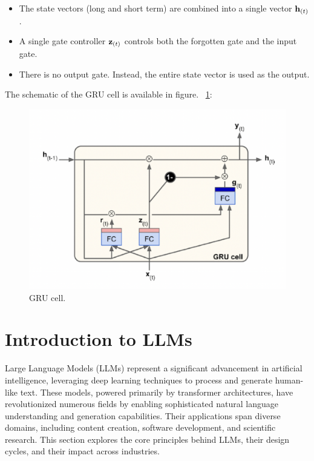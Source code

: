\begin{itemize}
    \item The state vectors (long and short term) are combined into a single vector ${\bf h}_{(t)}$.
    \item A single gate controller ${\bf z}_{(t)}$ controls both the forgotten gate and the input gate.
    \item There is no output gate. Instead, the entire state vector is used as the output.
\end{itemize}
The schematic of the GRU cell is available in figure. ~\ref{fig:GRU_cell}:
\begin{figure} [h!]
    \centering
    \includegraphics[width=\textwidth,height=\textheight,keepaspectratio]{Assets/Theory_and_methods/unnamed-9.png}
    \caption{GRU cell.}
    \label{fig:GRU_cell}
\end{figure}

\clearpage

\section{Introduction to LLMs}
Large Language Models (LLMs) represent a significant advancement in artificial intelligence, leveraging deep learning techniques to process and generate human-like text. These models, powered primarily by transformer architectures, have revolutionized numerous fields by enabling sophisticated natural language understanding and generation capabilities. Their applications span diverse domains, including content creation, software development, and scientific research. This section explores the core principles behind LLMs, their design cycles, and their impact across industries.
